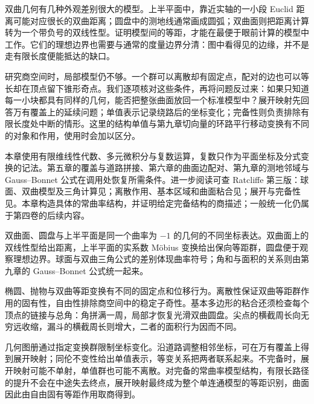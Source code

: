 双曲几何有几种外观差别很大的模型。上半平面中，靠近实轴的一小段 Euclid 距离可能对应很长的双曲距离；圆盘中的测地线通常画成圆弧；双曲面则把距离计算转为一个带负号的双线性型。证明模型间的等距，才能在最便于眼前计算的模型中工作。它们的理想边界也需要与通常的度量边界分清：图中看得见的边缘，并不是走有限长度便能抵达的缺口。

\ProseParagraphBreak

研究商空间时，局部模型仍不够。一个群可以离散却有固定点，配对的边也可以等长却在顶点留下锥形奇点。我们逐项核对这些条件，再将问题反过来：如果只知道每一小块都具有同样的几何，能否把整张曲面放回一个标准模型中？展开映射先回答万有覆盖上的延续问题；单值表示记录绕路后的坐标变化；完备性则负责排除有限长度处中断的情形。这里的结构单值与第九章切向量的环路平行移动变换有不同的对象和作用，使用时会加以区分。

\ProseParagraphBreak

本章使用有限维线性代数、多元微积分与复数运算，复数只作为平面坐标及分式变换的记法。第五章的覆盖与道路拼接、第六章的曲面边配对、第九章的测地邻域与 Gauss--Bonnet 公式在调用处恢复所需条件。进一步阅读可查 Ratcliffe 第三版：球面、双曲模型及三角计算见\cite[\S\S~2.3--2.5, 3.1--3.5, 4.3--4.6]{Ratcliffe2019}；离散作用、基本区域和曲面粘合见\cite[\S\S~4.7, 5.2--5.3, 6.6, 9.2, 9.7--9.8]{Ratcliffe2019}；展开与完备性见\cite[\S\S~8.3--8.5]{Ratcliffe2019}。本章构造具体的常曲率结构，并证明给定完备结构的商描述；一般统一化仍属于第四卷的后续内容。





\begin{chaptersummary}
	双曲面、圆盘与上半平面是同一个曲率为 \(-1\) 的几何的不同坐标表达。双曲面上的双线性型给出距离，上半平面的实系数 Möbius 变换给出保向等距群，圆盘便于观察理想边界。球面与双曲三角公式的差别体现曲率符号；角和与面积的关系则由第九章的 Gauss--Bonnet 公式统一起来。

	\ProseParagraphBreak

	椭圆、抛物与双曲等距变换有不同的固定点和位移行为。离散性保证双曲等距群作用的固有性，自由性排除商空间中的稳定子奇性。基本多边形的粘合还须检查每个顶点的链接与总角：角拼满一周，局部才恢复光滑双曲圆盘。尖点的横截周长向无穷远收缩，漏斗的横截周长则增大，二者的面积行为因而不同。

	\ProseParagraphBreak

	几何图册通过指定变换群限制坐标变化。沿道路调整相邻坐标，可在万有覆盖上得到展开映射；同伦不变性给出单值表示，等变关系把两者联系起来。不完备时，展开映射可能不单射，单值群也可能不离散。对完备的常曲率模型结构，有限长路径的提升不会在中途失去终点，展开映射最终成为整个单连通模型的等距识别，曲面因此由自由固有等距作用取商得到。
\end{chaptersummary}


